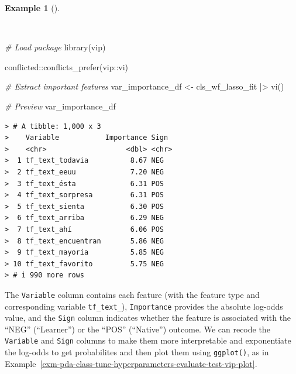 \documentclass[
  letterpaper,
  DIV=11,
  numbers=noendperiod]{scrreprt}
\newenvironment{Shaded}{\begin{snugshade}}{\end{snugshade}}
\newcommand{\CommentTok}[1]{\textcolor[rgb]{0.00,0.00,0.00}{\textit{#1}}}
\newcommand{\FunctionTok}[1]{\textcolor[rgb]{0.00,0.00,0.00}{#1}}
\newcommand{\NormalTok}[1]{\textcolor[rgb]{0.00,0.00,0.00}{#1}}
\newcommand{\OtherTok}[1]{\textcolor[rgb]{0.00,0.00,0.00}{#1}}
\newcommand{\SpecialCharTok}[1]{\textcolor[rgb]{0.00,0.00,0.00}{#1}}
\theoremstyle{definition}
\newtheorem{example}{Example}[chapter]
\theoremstyle{remark}
\begin{document}
\begin{example}[]\protect\hypertarget{exm-pda-class-tune-hyperparameters-evaluate-test-vip}{}\label{exm-pda-class-tune-hyperparameters-evaluate-test-vip}

~

\begin{Shaded}
\begin{Highlighting}[]
\CommentTok{\# Load package}
\FunctionTok{library}\NormalTok{(vip)}

\NormalTok{conflicted}\SpecialCharTok{::}\FunctionTok{conflicts\_prefer}\NormalTok{(vip}\SpecialCharTok{::}\NormalTok{vi)}

\CommentTok{\# Extract important features}
\NormalTok{var\_importance\_df }\OtherTok{\textless{}{-}}
\NormalTok{  cls\_wf\_lasso\_fit }\SpecialCharTok{|\textgreater{}}
  \FunctionTok{vi}\NormalTok{()}

\CommentTok{\# Preview}
\NormalTok{var\_importance\_df}
\end{Highlighting}
\end{Shaded}

\begin{verbatim}
> # A tibble: 1,000 x 3
>    Variable           Importance Sign 
>    <chr>                   <dbl> <chr>
>  1 tf_text_todavia          8.67 NEG  
>  2 tf_text_eeuu             7.20 NEG  
>  3 tf_text_ésta             6.31 POS  
>  4 tf_text_sorpresa         6.31 POS  
>  5 tf_text_sienta           6.30 POS  
>  6 tf_text_arriba           6.29 NEG  
>  7 tf_text_ahí              6.06 POS  
>  8 tf_text_encuentran       5.86 NEG  
>  9 tf_text_mayoría          5.85 NEG  
> 10 tf_text_favorito         5.75 NEG  
> # i 990 more rows
\end{verbatim}

\end{example}

The \texttt{Variable} column contains each feature (with the feature
type and corresponding variable \texttt{tf\_text\_}),
\texttt{Importance} provides the absolute log-odds value, and the
\texttt{Sign} column indicates whether the feature is associated with
the ``NEG'' (``Learner'') or the ``POS'' (``Native'') outcome. We can
recode the \texttt{Variable} and \texttt{Sign} columns to make them more
interpretable and exponentiate the log-odds to get probabilites and then
plot them using \texttt{ggplot()}, as in
Example~\ref{exm-pda-class-tune-hyperparameters-evaluate-test-vip-plot}.
\end{document}
